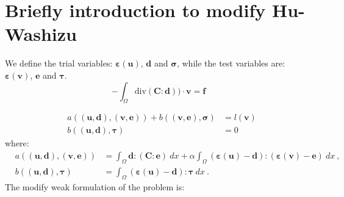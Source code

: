 \documentclass[preprint,12pt,authoryear]{elsarticle}
\begin{document}
\section{Briefly introduction to modify Hu-Washizu}
We define the trial variables: $\bm{\varepsilon}(\bm{u})$, $\bm{d}$ and 
$\bm{\sigma}$, while the test variables are: $\bm{\varepsilon}(\bm{v})$, 
$\bm{e}$ and $\bm{\tau}$. 
\begin{equation}
-\int_{\Omega} \mbox{div} ( \bm{C} : \bm{d}) )\cdot \bm{v} = \bm{f}
\end{equation}

\begin{eqnarray}
& a( (\bm{u},\bm{d}), (\bm{v}, \bm{e}) ) 
+ b( (\bm{v}, \bm{e}), \bm{\sigma} ) &= l(\bm{v}) \\
& b( (\bm{u},\bm{d}), \bm{\tau} )                                 &= 0
\end{eqnarray}
where:
\begin{eqnarray}
& a( (\bm{u},\bm{d}), (\bm{v}, \bm{e}) ) 
&= \int_{\Omega} \bm{d} : (\bm{C}:\bm{e}) \: dx 
+ \alpha \int_{\Omega} (\bm{\varepsilon}(\bm{u}) 
- \bm{d}):(\bm{\varepsilon}(\bm{v}) - \bm{e}) \: dx \:, \\
& b( (\bm{u},\bm{d}), \bm{\tau} ) &= 
\int_{\Omega} (\bm{\varepsilon}(\bm{u}) - \bm{d}) : \bm{\tau} \: dx \:.
\end{eqnarray}
The modify weak formulation of the problem is:
\end{document}
